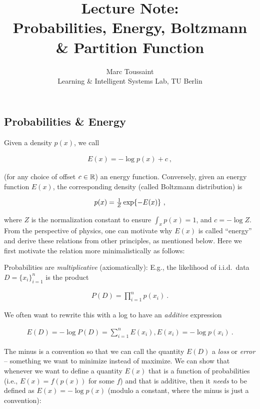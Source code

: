 
\note

\title{Lecture Note:\\ Probabilities, Energy, Boltzmann \& Partition Function}
\author{Marc Toussaint\\\small Learning \& Intelligent Systems Lab, TU Berlin}

\makeatletter
\renewcommand{\@seccntformat}[1]{}
\makeatother

\notetitle


\subsection{Probabilities \& Energy}

Given a density $p(x)$, we call

\begin{align}
E(x) = -\log p(x) + c ~,
\end{align}

(for any choice of offset $c\in{\mathbb{R}}$) an energy function. Conversely, given an energy function $E(x)$, the corresponding density (called Boltzmann distribution) is

\begin{align}
p(x) = \textstyle\frac 1Z \exp\lbrace-E(x)\rbrace ~,
\end{align}

where $Z$ is the normalization constant to ensure $\int_x p(x) = 1$,
and $c=-\log Z$. From the perspective of physics, one can motivate why
$E(x)$ is called ``energy'' and derive these relations from other
principles, as mentioned below. Here we first motivate the
relation more minimalistically as follows:

Probabilities are \emph{multiplicative} (axiomatically): E.g., the likelihood of i.i.d.\ data $D = \lbrace x_i \rbrace_{i=1}^n$ is the product

\begin{align}
P(D) = \prod_{i=1}^n p(x_i) ~.
\end{align}

We often want to rewrite this with a log to have an \emph{additive} expression

\begin{align}
E(D) = -\log P(D) = \sum_{i=1}^n E(x_i) \comma E(x_i) = -\log p(x_i) ~.
\end{align}

The minus is a convention so that we can call the quantity $E(D)$
a \emph{loss} or \emph{error} -- something we want to minimize instead
of maximize. We can show that whenever we want to define a
quantity $E(x)$ that is a function of probabilities (i.e., $E(x) =
f(p(x))$ for some $f$) and that is additive, then it \emph{needs} to
be defined as $E(x) = -\log p(x)$ (modulo a constant, where the minus
is just a convention):


